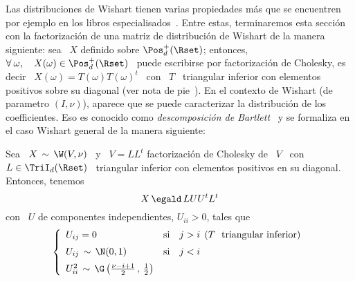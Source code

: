 Las distribuciones de Wishart tienen  varias propiedades m\'as que se encuentren
por ejemplo  en los  libros especialisados~\cite{Mui82, GupNag99,  And03, Seb04,
  NadKot04}. Entre estas, terminaremos  esta secci\'on con la factorizaci\'on de
una  matriz de  distribuci\'on de  Wishart  de la  manera siguiente:  sea \  $X$
definido sobre  $\Pos_d^+(\Rset)$; entonces, \ $\forall \:  \omega, \quad X(\omega)
\in \Pos_d^+(\Rset)$ \ puede escribirse por factorizaci\'on de Cholesky, es decir \
$X(\omega)  = T(\omega)  T(\omega)^t$  \ con  \  $T$ \  triangular inferior  con
elementos     positivos      sobre     su     diagonal      (ver     nota     de
pie~\footref{Foot:MP:WishartXtilde}).  En  el contexto de  Wishart (de parametro
$(I,\nu)$),  aparece  que  se   puede  caracterizar  la  distribuci\'on  de  los
coefficientes.     Eso    es   conocido    como    {\em   descomposici\'on    de
  Bartlett}~\cite{Bar34,  Mui82,  BilBre99,  GupNag99,  And03,  NadKot04}  y  se
formaliza en el caso Wishart general de la manera siguiente:
%
\begin{teorema}\label{Teo:MP:Bartlett}
%
  Sea \ $X \,  \sim \, \W(V,\nu)$ \ y \ $V =  L L^t$ factorizaci\'on de Cholesky
  de  \ $V$  \ con  \ $L  \in \TriI_d(\Rset)$  \ triangular  inferior con elementos positivos en su diagonal. Entonces,
  tenemos
  \[
  X \, \egald \, L U U^t L^t
  \]
  con \ $U$ de componentes independientes, $U_{ii} > 0$, tales que
  \[
  \left\{\begin{array}{lll}
  U_{ij} = 0 & \mbox{si} & j > i \:\: \mbox{($T$ \ triangular inferior)}\\[2mm]
  U_{ij} \, \sim \, \N(0,1) & \mbox{si} & j < i\\[2mm]
  U_{ii}^2 \, \sim \, \G\left( \frac{\nu-i+1}{2} \, , \, \frac12 \right) & &
  \end{array}\right.
  \]
\end{teorema}
%
